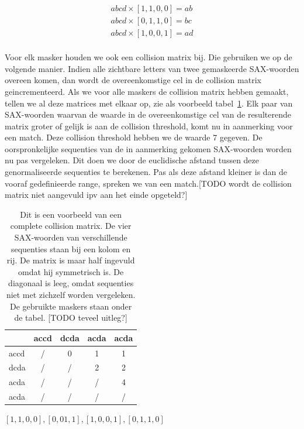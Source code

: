 \documentclass{article}
\begin{document}
\begin{equation}
\label{seq:maskering}
\begin{aligned}
abcd \times [1,1,0,0] = ab \\
abcd \times [0,1,1,0] = bc \\
abcd \times [1,0,0,1] = ad \\
\end{aligned} 
\end{equation}

Voor elk masker houden we ook een collision matrix bij. Die gebruiken we op de volgende manier. Indien alle zichtbare letters van twee gemaskeerde SAX-woorden overeen komen, dan wordt de overeenkomstige cel in de collision matrix geincrementeerd. Als we voor alle maskers de collision matrix hebben gemaakt, tellen we al deze matrices met elkaar op, zie als voorbeeld tabel~\ref{tab:collision_matrix}. Elk paar van SAX-woorden waarvan de waarde in de overeenkomstige cel van de resulterende matrix groter of gelijk is aan de collision threshold, komt nu in aanmerking voor een match. Deze collision threshold hebben we de waarde 7 gegeven. De oorspronkelijke sequenties van de in aanmerking gekomen SAX-woorden worden nu pas vergeleken. Dit doen we door de euclidische afstand tussen deze genormaliseerde sequenties te berekenen. Pas als deze afstand kleiner is dan de vooraf gedefinieerde range, spreken we van een match.[TODO wordt de collision matrix niet aangevuld ipv aan het einde opgeteld?]


\begin{table}
\caption{Dit is een voorbeeld van een complete collision matrix. De vier SAX-woorden van verschillende sequenties staan bij een kolom en rij. De matrix is maar half ingevuld omdat hij symmetrisch is.  De diagonaal is leeg, omdat sequenties niet met zichzelf worden vergeleken. De gebruikte maskers staan onder de tabel. [TODO teveel uitleg?]}
\label{tab:collision_matrix}
\centering
\begin{tabular}{ l || c | c | c | c }
& accd & dcda & acda & acda \\ \hline
\hline
accd & / & 0 & 1 & 1 \\ \hline
dcda & / & / & 2 & 2 \\ \hline
acda & / & / & / & 4 \\ \hline
acda & / & / & / & / \\
\hline
\end{tabular}\par

$[1,1,0,0], [0,01,1], [1,0,0,1], [0,1,1,0]$
\end{table}
\end{document}
